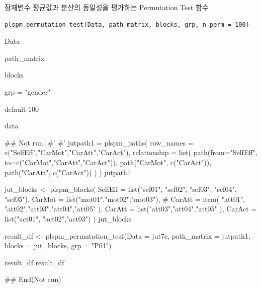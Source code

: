\documentclass[a4paper]{book}
\begin{document}
%
\begin{Description}
잠재변수 평균값과 분산의 동일성을 평가하는 Permutation Test 함수
\end{Description}
%
\begin{Usage}
\begin{verbatim}
plspm_permutation_test(Data, path_matrix, blocks, grp, n_perm = 100)
\end{verbatim}
\end{Usage}
%
\begin{Arguments}
\begin{ldescription}
\item[\code{Data}] Data

\item[\code{path\_matrix}] path\_matrix

\item[\code{blocks}] blocks

\item[\code{grp}] grp = "gender"

\item[\code{n\_perm}] default 100
\end{ldescription}
\end{Arguments}
%
\begin{Value}
data
\end{Value}
%
\begin{Examples}
\begin{ExampleCode}
\#\# Not run: 
#'
#'
jutpath1 = plspm_paths(
  row_names = c("SelfEff","CarMot","CarAtt","CarAct"),
  relationship = list(
    path(from="SelfEff", to=c("CarMot","CarAtt","CarAct")),
    path("CarMot", c("CarAct")),
    path("CarAtt", c("CarAct"))
  )  )
jutpath1


jut_blocks <- plspm_blocks(
  SelfEff = list("sef01", "sef02", "sef03", "sef04", "sef05"),
  CarMot = list("mot01","mot02","mot03"),
  #   CarAtt = item( "att01", "att02","att03","att04","att05" ),
  CarAtt = list("att03","att04","att05" ),
  CarAct = list("act01", "act02","act03")
)
jut_blocks


result_df <- plspm_permutation_test(Data = jut7c, path_matrix = jutpath1, blocks = jut_blocks, grp = "P01")


result_df
result_df %



## End(Not run)

\end{ExampleCode}
\end{Examples}
\end{document}
